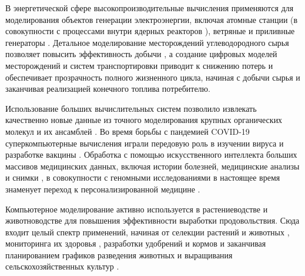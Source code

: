 \documentclass[a4paper,14pt]{extarticle}                     %
\numberwithin{equation}{section}                             %
\numberwithin{figure}{section}                               %
\numberwithin{table}{section}                                %
\theoremstyle{plain}                                         %
\numberwithin{theorem}{section}                              %
\numberwithin{lemma}{section}                                %
\numberwithin{definition}{section}                           %
\begin{document}
В энергетической сфере высокопроизводительные вычисления применяются для моделирования объектов генерации электроэнергии, включая атомные станции \cite{Cancemi2025SuperNuc} (в совокупности с процессами внутри ядерных реакторов \cite{Zhang2025SuperNuclear}), ветряные и приливные генераторы \cite{Quint2025SuperWind,Parrado2024SuperTidal}.
Детальное моделирование месторождений углеводородного сырья позволяет повысить эффективность добычи \cite{Usmanov2024SuperPlast}, а создание цифровых моделей месторождений и систем транспортировки \cite{Didenko2023SuperOil} приводит к снижению потерь и обеспечивает прозрачность полного жизненного цикла, начиная с добычи сырья и заканчивая реализацией конечного топлива потребителю.

Использование больших вычислительных систем позволило извлекать качественно новые данные из точного моделирования крупных органических молекул и их ансамблей \cite{Teplukhin2009SuperBigMolec}.
Во время борьбы с пандемией COVID-19 суперкомпьютерные вычисления играли передовую роль в изучении вируса и разработке вакцины \cite{Colonnelli2021SuperCovid}.
Обработка с помощью искусственного интеллекта больших массивов медицинских данных, включая истории болезней, медицинские анализы и снимки \cite{Ri2024SuperXRay}, в совокупности с геномными исследованиями в настоящее время знаменует переход к персонализированной медицине \cite{Kishore2024SuperPrecMed}.

Компьютерное моделирование активно используется в растениеводстве и животноводстве для повышения эффективности выработки продовольствия.
Сюда входит целый спектр применений, начиная от селекции растений и животных \cite{Ahmetshina2020SuperSelection}, мониторинга их здоровья \cite{Mourant2018SuperEpi}, разработки удобрений и кормов \cite{Irfan2016SuperFert} и заканчивая планированием графиков разведения животных и выращивания сельскохозяйственных культур \cite{Zhang2021SuperFertPlan}.
\end{document}

